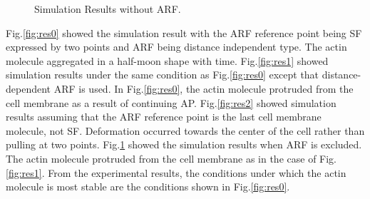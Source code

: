 \documentclass[a4paper,12pt]{book}
\begin{document}
\begin{figure}[tbp]
 \caption{Simulation Results without ARF.}
 \label{fig:res3}
\end{figure}

Fig.\ref{fig:res0} showed the simulation result with the ARF reference point being SF expressed by two points and ARF being distance independent type. The actin molecule aggregated in a half-moon shape with time. Fig.\ref{fig:res1} showed simulation results under the same condition as Fig.\ref{fig:res0} except that distance-dependent ARF is used. In Fig.\ref{fig:res0}, the actin molecule protruded from the cell membrane as a result of continuing AP. Fig.\ref{fig:res2} showed simulation results assuming that the ARF reference point is the last cell membrane molecule, not SF. Deformation occurred towards the center of the cell rather than pulling at two points. Fig.\ref{fig:res3} showed the simulation results when ARF is excluded. The actin molecule protruded from the cell membrane as in the case of Fig.\ref{fig:res1}. From the experimental results, the conditions under which the actin molecule is most stable are the conditions shown in Fig.\ref{fig:res0}. 
\end{document}
